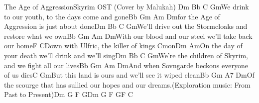 \documentclass[a5paper,9pt]{article}
\begin{document}
            \begin{song}{The Age of Aggression}{Skyrim OST (Cover by Malukah)}
                                                                                       Dm           Bb            C             Gm\newline                            We drink to our youth, to the days come and gone\newline                                    Bb         Gm        Am         Dm\newline                            for the Age of Aggression is just about done\newline                                  Dm            Bb                 C            Gm\newline                            We'll drive out the Stormcloaks and restore what we own\newline                                     Bb            Gm          Am            Dm\newline                            With our blood and our steel we'll take back our home\newline                                                                                    F                     C\newline                            Down with Ulfric, the killer of kings Cmon\newline                                   Dm                      Am\newline                            On the day of your death we'll drink and we'll sing\newline                                      Dm          Bb             C             Gm\newline                            We're the children of Skyrim, and we fight all our lives\newline                                     Bb        Gm           Am        Dm\newline                            And when Sovngarde beckons everyone of us dies\newline                                                                                         C                          Gm\newline                            But this land is ours and we'll see it wiped clean\newline                                   Bb               Gm           A7            Dm\newline                            Of the scourge that has sullied our hopes and our dreams.\newline                                                        (Exploration music: From Past to Present)\newline                            Dm G F G\newline                            Dm G F G\newline                                                        F                     C\newline                   
\end{song}
\end{document}
